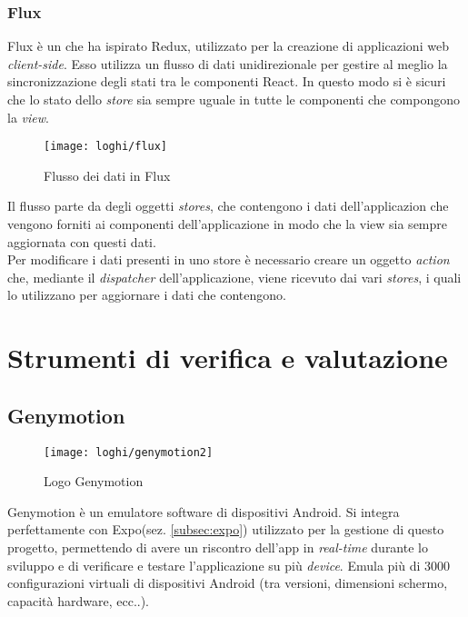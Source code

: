 \subsubsection{Flux} \label{subsubsec:flux}
 Flux è un  che ha ispirato Redux, utilizzato per la 
 creazione di applicazioni web \emph{client-side}. Esso utilizza un flusso di dati 
 unidirezionale per gestire al meglio la sincronizzazione degli stati tra le 
 componenti React. In questo modo si è sicuri che lo stato dello \emph{store} sia 
 sempre uguale in tutte le componenti che compongono la \emph{view}.
 
 \begin{figure}[H] 
 	\centering
 	\texttt{[image: loghi/flux]}
 	\caption{Flusso dei dati in Flux}
 \end{figure}
 Il flusso parte da degli oggetti \emph{stores}, che contengono i dati dell’applicazion che vengono forniti ai componenti dell'applicazione in modo che la view sia sempre aggiornata con questi dati. \\
Per modificare i dati presenti in uno store è necessario creare un oggetto \emph{action} che, mediante il \emph{dispatcher} dell’applicazione, viene ricevuto dai vari \emph{stores}, i quali lo utilizzano per aggiornare i dati che contengono.

 
\section{Strumenti di verifica e valutazione}

\subsection{Genymotion} \label{subsez:genymotion}
\begin{figure}[H] 
	\centering
	\texttt{[image: loghi/genymotion2]}
	\caption{Logo Genymotion}
\end{figure}
Genymotion è un emulatore software di dispositivi Android. Si integra 
perfettamente con Expo(sez. \ref{subsec:expo}) utilizzato per la gestione di 
questo progetto, permettendo di avere un riscontro dell'app in \emph{real-time} durante 
lo sviluppo e di verificare e testare l'applicazione su più \emph{device}. Emula più 
di 3000 configurazioni virtuali di dispositivi Android (tra versioni, dimensioni 
schermo, capacità hardware, ecc..). 

